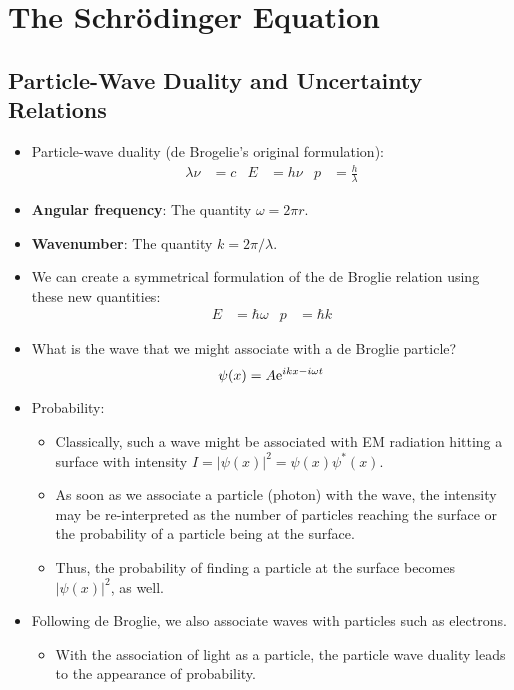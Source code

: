 \documentclass[../notes.tex]{subfiles}
\begin{document}
\chapter{The Schr\"{o}dinger Equation}
\section{Particle-Wave Duality and Uncertainty Relations}
\begin{itemize}
    \item {}Particle-wave duality (de Brogelie's original formulation):
    \begin{align*}
        \lambda\nu &= c&
        E &= h\nu&
        p &= \frac{h}{\lambda}
    \end{align*}
    \item \textbf{Angular frequency}: The quantity $\omega=2\pi r$.
    \item \textbf{Wavenumber}: The quantity $k=2\pi/\lambda$.
    \item We can create a symmetrical formulation of the de Broglie relation using these new quantities:
    \begin{align*}
        E &= \hbar\omega&
        p &= \hbar k
    \end{align*}
    \item What is the wave that we might associate with a de Broglie particle?
    \begin{equation*}
        \psi(x) = A\e[ikx-i\omega t]
    \end{equation*}
    \item Probability:
    \begin{itemize}
        \item Classically, such a wave might be associated with EM radiation hitting a surface with intensity $I=|\psi(x)|^2=\psi(x)\psi^*(x)$.
        \item As soon as we associate a particle (photon) with the wave, the intensity may be re-interpreted as the number of particles reaching the surface or the probability of a particle being at the surface.
        \item Thus, the probability of finding a particle at the surface becomes $|\psi(x)|^2$, as well.
    \end{itemize}
    \item Following de Broglie, we also associate waves with particles such as electrons.
    \begin{itemize}
        \item With the association of light as a particle, the particle wave duality leads to the appearance of probability.

\end{itemize}
\end{itemize}
\end{document}
